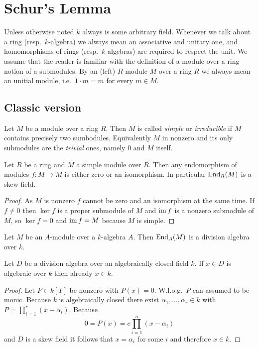 \chapter{Schur’s Lemma}
Unless otherwise noted $k$ always is some arbitrary field. Whenever we talk about a ring (resp.\ $k$-algebra) we always mean an associative and unitary one, and homomorphisms of rings (resp.\ $k$-algebras) are required to respect the unit. We assume that the reader is familiar with the definition of a module over a ring notion of a submodules. By an (left) $R$-module $M$ over a ring $R$ we always mean an unitial module, i.e.\ $1 \cdot m = m$ for every $m \in M$.





\section{Classic version}


\begin{defi}
 Let $M$ be a module over a ring $R$. Then $M$ is called \emph{simple} or \emph{irreducible} if $M$ contains precisely two sumbodules. Equivalently $M$ in nonzero and its only submodules are the \emph{trivial} ones, namely $0$ and $M$ itself.
\end{defi}


\begin{lem}[Schur] \label{lem: Schur general part about skew field}
 Let $R$ be a ring and $M$ a simple module over $R$. Then any endomorphism of modules $f \colon M \to M$ is either zero or an isomorphism. In particular $\operatorname{End}_R(M)$ is a skew field.
\end{lem}
\begin{proof}
 As $M$ is nonzero $f$ cannot be zero and an isomorphism at the same time. If $f \neq 0$ then $\ker f$ is a proper submodule of $M$ and $\operatorname{im} f$ is a nonzero submodule of $M$, so $\ker f = 0$ and $\operatorname{im} f = M$ because $M$ is simple.
\end{proof}


\begin{cor}
 Let $M$ be an $A$-module over a $k$-algebra $A$. Then $\operatorname{End}_A(M)$ is a division algebra over $k$.
\end{cor}


\begin{lem}\label{lem: algebraic elements over algebraically closed fields}
 Let $D$ be a division algebra over an algebraically closed field $k$. If $x \in D$ is algebraic over $k$ then already $x \in k$.
\end{lem}
\begin{proof}
 Let $P \in k[T]$ be nonzero with $P(x) = 0$. W.l.o.g.\ $P$ can assumed to be monic. Because $k$ is algebraically closed there exist $\alpha_1, \dotsc, \alpha_r \in k$ with $P = \prod_{i=1}^r (x-\alpha_i)$. Because
 \[
  0 = P(x) = c \prod_{i=1}^n (x-\alpha_i)
 \]
 and $D$ is a skew field it follows that $x = \alpha_i$ for some $i$ and therefore $x \in k$.
\end{proof}


